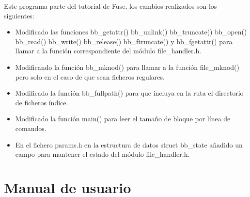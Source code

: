 \documentclass[a4paper,12pt]{article}
\begin{document}
Este programa parte del tutorial de Fuse, los cambios realizados son los siguientes:


\begin{itemize}
\item Modificado las funciones bb\_getattr() bb\_unlink() bb\_truncate() bb\_open() bb\_read() bb\_write() bb\_release() bb\_ftruncate() y bb\_fgetattr() para llamar a la función correspondiente del módulo file\_handler.h.
\item Modificando la función bb\_mknod() para llamar a la función file\_mknod() pero solo en el caso de que sean ficheros regulares.
\item Modificado la función bb\_fullpath() para que incluya en la ruta el directorio de ficheros índice.
\item Modificado la función main() para leer el tamaño de bloque por línea de comandos.
\item En el fichero params.h en la estructura de datos struct bb\_state añadido un campo para mantener el estado del módulo file\_handler.h.
\end{itemize}















\section{Manual de usuario}
\end{document}

